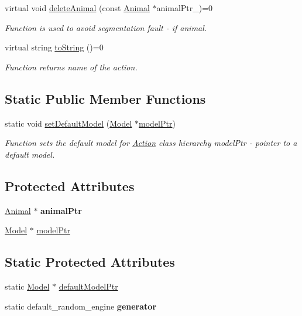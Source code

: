 \begin{DoxyCompactItemize}
virtual void \hyperlink{class_action_a3e44b723755059935ee658ac1472ee9e}{delete\+Animal} (const \hyperlink{class_animal}{Animal} $\ast$animal\+Ptr\+\_\+)=0
\begin{DoxyCompactList}\small\item\em Function is used to avoid segmentation fault -\/ if animal. \end{DoxyCompactList}\item 
virtual string \hyperlink{class_action_a752a31c122f369e92c3e09cdc1a6d617}{to\+String} ()=0
\begin{DoxyCompactList}\small\item\em Function returns name of the action. \end{DoxyCompactList}\end{DoxyCompactItemize}
\subsection*{Static Public Member Functions}
\begin{DoxyCompactItemize}
\item 
static void \hyperlink{class_action_a1561b27a20176b1f32ca6f2d5dd94869}{set\+Default\+Model} (\hyperlink{class_model}{Model} $\ast$\hyperlink{class_action_a451d89d07a4cfe44be1fc52490907139}{model\+Ptr})
\begin{DoxyCompactList}\small\item\em Function sets the default model for \hyperlink{class_action}{Action} class hierarchy  model\+Ptr -\/ pointer to a default model. \end{DoxyCompactList}\end{DoxyCompactItemize}
\subsection*{Protected Attributes}
\begin{DoxyCompactItemize}
\item 
\hypertarget{class_action_a37711c4920bfbf5ccf7a82e6165e6cf2}{}\hyperlink{class_animal}{Animal} $\ast$ {\bfseries animal\+Ptr}\label{class_action_a37711c4920bfbf5ccf7a82e6165e6cf2}

\item 
\hyperlink{class_model}{Model} $\ast$ \hyperlink{class_action_a451d89d07a4cfe44be1fc52490907139}{model\+Ptr}
\end{DoxyCompactItemize}
\subsection*{Static Protected Attributes}
\begin{DoxyCompactItemize}
\item 
static \hyperlink{class_model}{Model} $\ast$ \hyperlink{class_action_a688c952ee1ee0b25927abd22deadcb4e}{default\+Model\+Ptr}
\item 
\hypertarget{class_action_a7c00867d21a3269e9fda29c9de3cde66}{}static default\+\_\+random\+\_\+engine {\bfseries generator}\label{class_action_a7c00867d21a3269e9fda29c9de3cde66}

\end{DoxyCompactItemize}


